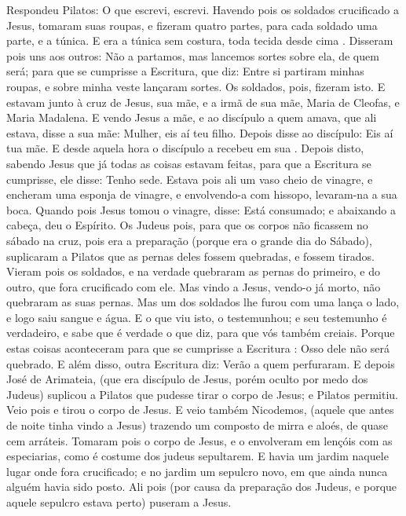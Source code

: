{  Respondeu Pilatos: O que escrevi, escrevi.
  Havendo pois os soldados crucificado a Jesus, tomaram suas roupas, e fizeram quatro partes, para cada soldado uma parte, e a túnica. E era a túnica sem costura, toda tecida desde cima
{} .
  Disseram pois uns aos outros: Não a partamos, mas lancemos sortes sobre ela, de quem será; para que se cumprisse a Escritura, que diz: Entre si partiram minhas roupas, e sobre minha veste lançaram sortes. Os soldados, pois, fizeram isto.
  E estavam junto à cruz de Jesus, sua mãe, e a irmã de sua mãe, Maria
{} de Cleofas, e Maria Madalena.
  E vendo Jesus a
{} mãe, e ao discípulo a quem amava, que ali estava, disse a sua mãe: Mulher, eis aí teu filho.
  Depois disse ao discípulo: Eis aí tua mãe. E desde aquela hora o discípulo a recebeu em sua
{} .
  Depois disto, sabendo Jesus que já todas as coisas estavam feitas, para que a Escritura se cumprisse, ele disse: Tenho sede.
  Estava pois ali um vaso cheio de vinagre, e encheram uma esponja de vinagre, e envolvendo-a com hissopo, levaram-na a sua boca.
  Quando pois Jesus tomou o vinagre, disse: Está consumado; e abaixando a cabeça, deu o Espírito.
  Os Judeus pois, para que os corpos não ficassem no sábado na cruz, pois era a preparação (porque era o grande dia do Sábado), suplicaram a Pilatos que as pernas deles fossem quebradas, e fossem tirados.
  Vieram pois os soldados, e na verdade quebraram as pernas do primeiro, e do outro, que fora crucificado com ele.
  Mas vindo a Jesus,
{} vendo-o já morto, não quebraram as suas pernas.
  Mas um dos soldados lhe furou com uma lança o lado, e logo saiu sangue e água.
  E o que viu isto, o testemunhou; e seu testemunho é verdadeiro, e sabe que é verdade o que diz, para que vós também creiais.
  Porque estas coisas aconteceram para que se cumprisse a Escritura
{} : Osso dele não será quebrado.
  E além disso, outra Escritura diz: Verão
{} a quem perfuraram.
  E depois José de Arimateia, (que era discípulo de Jesus, porém oculto por medo dos Judeus) suplicou a Pilatos que pudesse tirar o corpo de Jesus; e Pilatos permitiu. Veio pois e tirou o corpo de Jesus.
  E veio também Nicodemos, (aquele que antes de noite tinha vindo a Jesus) trazendo um composto de mirra e aloés, de quase cem arráteis.
  Tomaram pois o corpo de Jesus, e o envolveram em lençóis com as especiarias, como é costume dos judeus sepultarem.
  E havia um jardim naquele lugar onde fora crucificado; e no jardim
{} um sepulcro novo, em que ainda nunca alguém havia sido posto.
  Ali pois (por causa da preparação
{} dos Judeus, e porque aquele sepulcro estava perto) puseram a Jesus.
\par }

